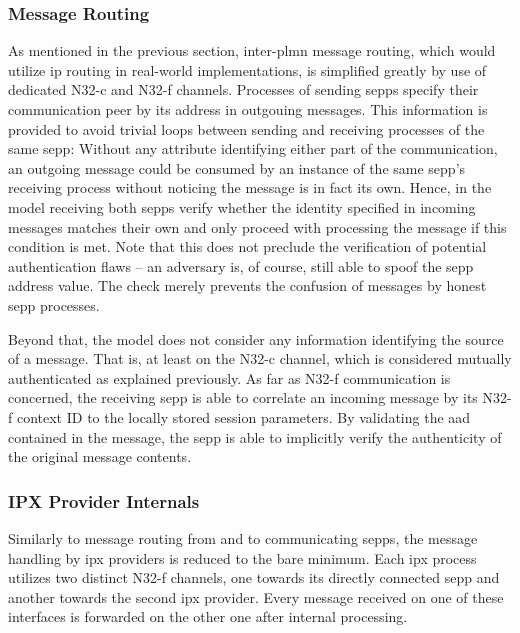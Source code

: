 \subsubsection{Message Routing}

As mentioned in the previous section, inter-\gls{plmn} message routing, which would utilize \gls{ip} routing in real-world implementations, is simplified greatly by use of dedicated N32-c and N32-f channels.
Processes of sending \glspl{sepp} specify their communication peer by its address in outgouing messages.
This information is provided to avoid trivial loops between sending and receiving processes of the same \gls{sepp}:
Without any attribute identifying either part of the communication, an outgoing message could be consumed by an instance of the same \gls{sepp}'s receiving process without noticing the message is in fact its own.
Hence, in the model receiving both \glspl{sepp} verify whether the identity specified in incoming messages matches their own and only proceed with processing the message if this condition is met.
Note that this does not preclude the verification of potential authentication flaws -- an adversary is, of course, still able to spoof the \gls{sepp} address value.
The check merely prevents the confusion of messages by honest \gls{sepp} processes.

Beyond that, the model does not consider any information identifying the source of a message.
That is, at least on the N32-c channel, which is considered mutually authenticated as explained previously.
As far as N32-f communication is concerned, the receiving \gls{sepp} is able to correlate an incoming message by its N32-f context ID to the locally stored session parameters.
By validating the \gls{aad} contained in the message, the \gls{sepp} is able to implicitly verify the authenticity of the original message contents.

\subsubsection{IPX Provider Internals}

Similarly to message routing from and to communicating \glspl{sepp}, the message handling by \gls{ipx} providers is reduced to the bare minimum.
Each \gls{ipx} process utilizes two distinct N32-f channels, one towards its directly connected \gls{sepp} and another towards the second \gls{ipx} provider.
Every message received on one of these interfaces is forwarded on the other one after internal processing.

